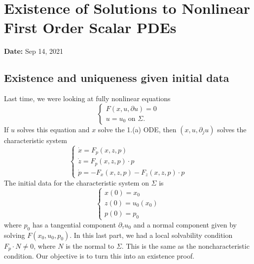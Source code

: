 \newpage
\section{Existence of Solutions to Nonlinear First Order Scalar PDEs}
\textbf{Date:} Sep 14, 2021

\subsection{Existence and uniqueness given initial data}
Last time, we were looking at fully nonlinear equations
\[
\begin{cases}
    F(x, u, \partial u) = 0\\
    u = u_0 \text{ on }\Sigma. 
\end{cases}
\]
If $u$ solves this equation and $x$ solve the 1.(a) ODE, then $(x,u,\partial_j u)$ solves the characteristic system 
\[
    \left\{\begin{array}{l}
        \dot{x}=F_{p}(x, z, p) \\
        \dot{z}=F_{p}(x, z, p) \cdot p \\
        \dot{p}=-F_{x}(x, z, p)-F_{z}(x, z, p) \cdot p
        \end{array}\right.
\]
The initial data for the characteristic system on $\Sigma$ is 
\[
    \left\{\begin{array}{l}
        x(0)=x_{0} \\
        z(0)=u_{0}\left(x_{0}\right) \\
        p(0)=p_{0}
        \end{array}\right.
\]
where $p_0$ has a tangential component $\partial_\tau u_0$ and a normal component given by solving $F(x_0, u_0, p_0)$. In this last part, we had a local solvability condition $F_p\cdot N \neq 0$, where $N$ is the normal to $\Sigma$. This is the same as the noncharacteristic condition.  Our objective is to turn this into an existence proof. 

